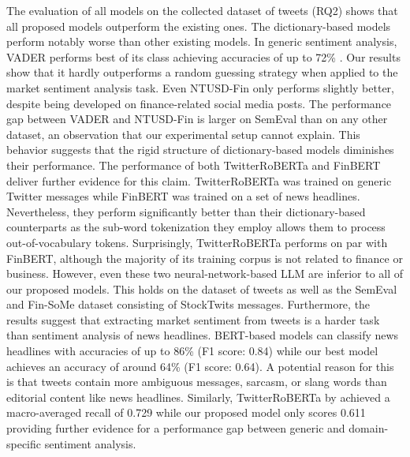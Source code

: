 The evaluation of all models on the collected dataset of tweets (RQ2) shows that all proposed models outperform the existing ones. The dictionary-based models perform notably worse than other existing models. In generic sentiment analysis, VADER performs best of its class achieving accuracies of up to 72\% . Our results show that it hardly outperforms a random guessing strategy when applied to the market sentiment analysis task. Even NTUSD-Fin only performs slightly better, despite being developed on finance-related social media posts. The performance gap between VADER and NTUSD-Fin is larger on SemEval than on any other dataset, an observation that our experimental setup cannot explain.
 This behavior suggests that the rigid structure of dictionary-based models diminishes their performance. The performance of both TwitterRoBERTa and FinBERT deliver further evidence for this claim. TwitterRoBERTa was trained on generic Twitter messages while FinBERT was trained on a set of news headlines. Nevertheless, they perform significantly better than their dictionary-based counterparts as the sub-word tokenization they employ allows them to process out-of-vocabulary tokens. Surprisingly, TwitterRoBERTa performs on par with FinBERT, although the majority of its training corpus is not related to finance or business. However, even these two neural-network-based LLM are inferior to all of our proposed models. This holds on the dataset of tweets as well as the SemEval and Fin-SoMe dataset consisting of StockTwits messages.\newline
 Furthermore, the results suggest that extracting market sentiment from tweets is a harder task than sentiment analysis of news headlines. BERT-based models can classify news headlines with accuracies of up to 86\% (F1 score: 0.84)  while our best model achieves an accuracy of around 64\% (F1 score: 0.64). A potential reason for this is that tweets contain more ambiguous messages, sarcasm, or slang words than editorial content like news headlines. Similarly, TwitterRoBERTa by  achieved a macro-averaged recall of 0.729 while our proposed model only scores 0.611 providing further evidence for a performance gap between generic and domain-specific sentiment analysis.

